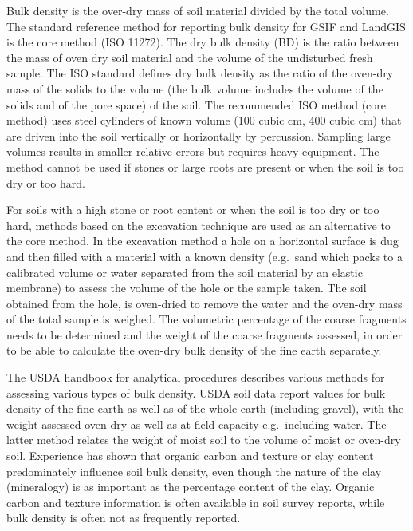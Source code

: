 \documentclass[graybox,natbib,nospthms,UStrade]{svmono}
\begin{document}
Bulk density is the over-dry mass of soil material divided by the total
volume. The standard reference method for reporting bulk density for
GSIF and LandGIS is the core method (ISO 11272). The dry bulk density (BD) is the
ratio between the mass of oven dry soil material and the volume of the
undisturbed fresh sample. The ISO standard defines dry bulk density as
the ratio of the oven-dry mass of the solids to the volume (the bulk
volume includes the volume of the solids and of the pore space) of the
soil. The recommended ISO method (core method) uses steel cylinders of
known volume (100 cubic cm, 400 cubic cm) that are driven into the soil vertically or
horizontally by percussion. Sampling large volumes results in smaller
relative errors but requires heavy equipment. The method cannot be used
if stones or large roots are present or when the soil is too dry or too
hard.

For soils with a high stone or root content or when the soil is too dry
or too hard, methods based on the excavation technique are used as an
alternative to the core method. In the excavation method a hole on a
horizontal surface is dug and then filled with a material with a known
density (e.g.~sand which packs to a calibrated volume or water separated
from the soil material by an elastic membrane) to assess the volume of
the hole or the sample taken. The soil obtained from the hole, is
oven-dried to remove the water and the oven-dry mass of the total sample
is weighed. The volumetric percentage of the coarse fragments needs to
be determined and the weight of the coarse fragments assessed, in order
to be able to calculate the oven-dry bulk density of the fine earth
separately.

The USDA handbook for analytical procedures describes various methods
for assessing various types of bulk density. USDA soil
data report values for bulk density of the fine earth as well as of the
whole earth (including gravel), with the weight assessed oven-dry as
well as at field capacity e.g.~including water. The latter method
relates the weight of moist soil to the volume of moist or oven-dry
soil. Experience has shown that organic carbon and texture or clay
content predominately influence soil bulk density, even though the
nature of the clay (mineralogy) is as important as the percentage
content of the clay. Organic carbon and texture information is often
available in soil survey reports, while bulk density is often not as
frequently reported.
\end{document}
